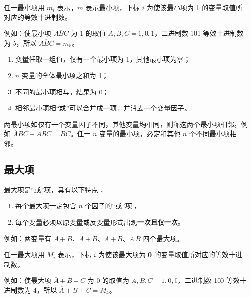 \begin{definition}[最小项的编号]
	任一最小项用 $m_i$ 表示，$m$ 表示最小项，下标 $i$ 为使该最小项为 1 的变量取值所对应的等效十进制数。

	例如：使最小项 $A\overline{B}C$ 为 1 的取值 $A,B,C=1,0,1$，二进制数 101 等效十进制数为 5，所以 $A\overline{B}C=m_5$。
\end{definition}

\begin{property}[最小项的性质]
	\begin{enumerate}
		\item 变量任取一组值，仅有一个最小项为 1，其他最小项为零；
		\item $n$ 变量的全体最小项之和为 1；
		\item 不同的最小项相与，结果为 0；
		\item 相邻最小项相“或”可以合并成一项，并消去一个变量因子。
	\end{enumerate}
\end{property}

\begin{definition}[最小项相邻]
	两最小项如仅有一个变量因子不同，其他变量均相同，则称这两个最小项相邻。例如 $\overline{A}BC+ABC=BC$。任一 $n$ 变量的最小项，必定和其他 $n$ 个不同最小项相邻。
\end{definition}

\subsection{最大项}
\label{sec:最大项}

\begin{definition}[最大项]
	最大项是“或”项，具有以下特点：
	\begin{enumerate}
		\item 每个最大项一定包含 $n$ 个因子的“或”项；
		\item 每个变量必须以原变量或反变量形式出现\textbf{一次且仅一次}。
	\end{enumerate}
	例如：两变量有 $A+B$、$A+\overline{B}$、$\overline{A}+B$、$\overline{A}\,\overline{B}$ 四个最大项。
\end{definition}

\begin{definition}[最大项的编号]
	任一最大项用 $M_i$ 表示，下标 $i$ 为使该最大项为 \textbf{0} 的变量取值所对应的等效十进制数。

	例如：使最大项 $\overline{A}+B+C$ 为 0 的取值为 $A,B,C=1,0,0$，二进制数 100 等效十进制数为 4，所以 $\overline{A}+B+C=M_4$。
\end{definition}

